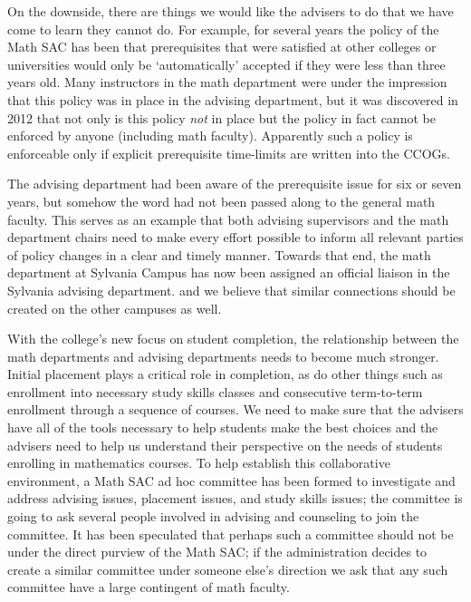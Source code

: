 On the downside, there are things we would like the advisers to do that we
have come to learn they cannot do.  For example, for several years the policy
of the Math SAC has been that prerequisites that were satisfied at other
colleges or universities would only be `automatically' accepted if they were
less than three years old.  Many instructors in the math department were under
the impression that this policy was in place in the advising department, but it
was discovered in 2012 that not only is this policy \emph{not} in place but the policy in fact cannot be enforced by anyone
(including math faculty).   Apparently such a policy is enforceable only if
explicit prerequisite time-limits are written into the CCOGs.  

The advising department had been aware of the prerequisite issue for six or
seven years, but somehow the word had not been passed along to the general math
faculty.  This serves as an example that both advising supervisors and the math
department chairs need to make every effort possible to inform all relevant
parties of policy changes in a clear and timely manner.  Towards that end, the
math department at Sylvania Campus has now been assigned an official liaison in
the Sylvania advising department. and we believe that similar connections
should be created on the other campuses as well.

With the college's new focus on student completion, the relationship between
the math departments and advising departments needs to become much stronger.
Initial placement plays a critical role in completion, as do other things such
as enrollment into necessary study skills classes and consecutive term-to-term
enrollment through a sequence of courses.  We need to make sure that the
advisers have all of the tools necessary to help students make the best choices
and the advisers need to help us understand their perspective on the needs of
students enrolling in mathematics courses.  To help establish this
collaborative environment, a Math SAC ad hoc committee has been formed to
investigate and address advising issues, placement issues, and study
skills issues;  the committee is going to ask several people involved in
advising and counseling to join the committee.  It has been speculated that
perhaps such a committee should not be under the direct purview of the Math
SAC; if the administration decides to create a similar committee under
someone else's direction we ask that any such committee have a large contingent
of math faculty.


